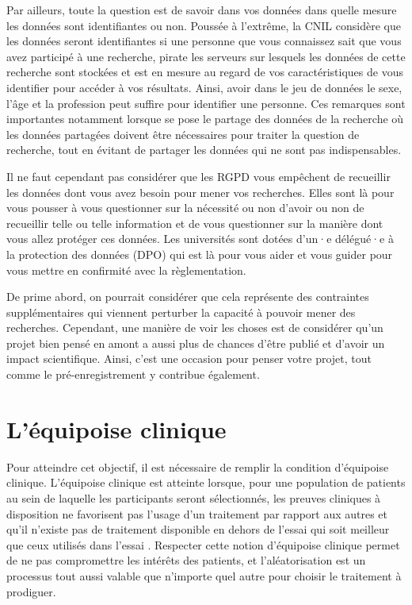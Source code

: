 \documentclass[
  12pt,
]{book}
\begin{document}
Par ailleurs, toute la question est de savoir dans vos données dans quelle mesure les données sont identifiantes ou non. Poussée à l'extrême, la CNIL considère que les données seront identifiantes si une personne que vous connaissez sait que vous avez participé à une recherche, pirate les serveurs sur lesquels les données de cette recherche sont stockées et est en mesure au regard de vos caractéristiques de vous identifier pour accéder à vos résultats. Ainsi, avoir dans le jeu de données le sexe, l'âge et la profession peut suffire pour identifier une personne. Ces remarques sont importantes notamment lorsque se pose le partage des données de la recherche où les données partagées doivent être nécessaires pour traiter la question de recherche, tout en évitant de partager les données qui ne sont pas indispensables.

Il ne faut cependant pas considérer que les RGPD vous empêchent de recueillir les données dont vous avez besoin pour mener vos recherches. Elles sont là pour vous pousser à vous questionner sur la nécessité ou non d'avoir ou non de recueillir telle ou telle information et de vous questionner sur la manière dont vous allez protéger ces données. Les universités sont dotées d'un·e délégué·e à la protection des données (DPO) qui est là pour vous aider et vous guider pour vous mettre en confirmité avec la règlementation.

De prime abord, on pourrait considérer que cela représente des contraintes supplémentaires qui viennent perturber la capacité à pouvoir mener des recherches. Cependant, une manière de voir les choses est de considérer qu'un projet bien pensé en amont a aussi plus de chances d'être publié et d'avoir un impact scientifique. Ainsi, c'est une occasion pour penser votre projet, tout comme le pré-enregistrement y contribue également.

\chapter{L'équipoise clinique}\label{luxe9quipoise-clinique}

Pour atteindre cet objectif, il est nécessaire de remplir la condition d'équipoise clinique. L'équipoise clinique est atteinte lorsque, pour une population de patients au sein de laquelle les participants seront sélectionnés, les preuves cliniques à disposition ne favorisent pas l'usage d'un traitement par rapport aux autres et qu'il n'existe pas de traitement disponible en dehors de l'essai qui soit meilleur que ceux utilisés dans l'essai \citep{Freedman1987}. Respecter cette notion d'équipoise clinique permet de ne pas compromettre les intérêts des patients, et l'aléatorisation est un processus tout aussi valable que n'importe quel autre pour choisir le traitement à prodiguer.
\end{document}
